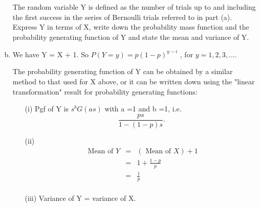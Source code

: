\documentclass[a4paper,12pt]{article}
\begin{document}
\begin{enumerate}[(a)]
\newpage
\begin{framed}
The random variable Y is defined as the number of trials up to and including
the first success in the series of Bernoulli trials referred to in part (a). Express
Y in terms of X, write down the probability mass function and the probability
generating function of Y and state the mean and variance of Y.

\end{framed}
\item We have Y = X + 1.
So $P(Y=y ) = p(1-p)^{y-i}$ , for $y= 1,2,3,...$.

The probability generating function of Y can be obtained by a similar method
to that used for X above, or it can be written down using the "linear
transformation" result for probability generating functions:
\begin{itemize}
\item[(i)] 
Pgf of Y is $s^bG(as)$ with a =1 and b =1, i.e. \[\frac{ps}{1-(1-p)s}.\]

\item[(ii)] 
\begin{eqnarray*}
\mbox{ Mean of } Y &=& (\mbox{ Mean of } X) + 1 \\ &=& 1 + \frac{1-p}{p} \\ &=& \frac{1}{p}\\
\end{eqnarray*}

\item[(iii)] Variance of Y = variance of X.
\end{itemize}
\end{enumerate}
\end{document}
